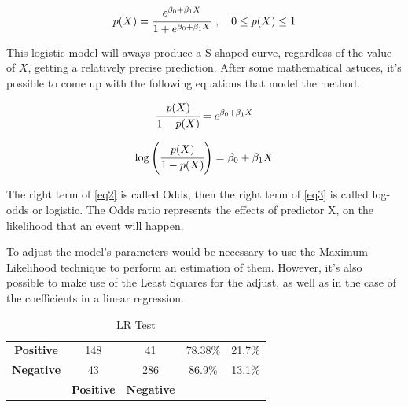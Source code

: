 \documentclass[conference]{IEEEtran}
\begin{document}
\begin{equation}
   p(X) = \cfrac{e^{\beta_0 + \beta_1X}}{1+e^{\beta_0 + \beta_1X}} \hspace{0.15cm}, \hspace{0.35cm} 0\leq p(X) \leq 1 \label{eq1}
\end{equation}

This logistic model will aways produce a S-shaped curve, regardless of the value of $X$, 
getting a relatively precise prediction. After some mathematical astuces, it's possible 
to come up with the following equations that model the method.

\begin{equation}
    \cfrac{p(X)}{1-p(X)} = e^{\beta_0+\beta_1X} \label{eq2}
\end{equation}

\begin{equation}
    \log \left(\cfrac{p(X)}{1-p(X)}\right) = \beta_0+\beta_1X \label{eq3}
\end{equation}

The right term of \eqref{eq2} is called Odds, then the right term of \eqref{eq3} is 
called log-odds or logistic. The Odds ratio represents the effects of predictor X, on the
likelihood that an event will happen.

To adjust the model's parameters would be necessary to use
the Maximum-Likelihood technique to perform an estimation of them. However, it's also possible
to make use of the Least Squares for the adjust, as well as in the case of the 
coefficients in a linear regression.

\begin{table}[htbp]
    \caption{LR Test}
    \begin{center}
    \begin{tabular}{|c|c|c|c|c|}
    \hline
    \cline{1-5}
    \textbf{Positive}& 148 & 41 & 78.38\% & 21.7\% \\
    \cline{1-5} 
    \textbf{Negative} & 43 & 286 & 86.9\% & 13.1\% \\
    \hline
     & \textbf{Positive} & \textbf{Negative} & & & \\
    \hline
    \end{tabular}
    \label{LR Test}
    \end{center}
\end{table}
\end{document}
